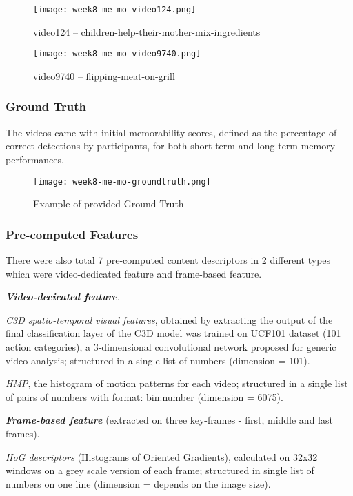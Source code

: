{\begin{figure}[!ht]
\centering
\texttt{[image: week8-me-mo-video124.png]}
\caption{video124 -- children-help-their-mother-mix-ingredients}
\end{figure}

\newpage
\begin{figure}[!ht]
\centering
\texttt{[image: week8-me-mo-video9740.png]}
\caption{video9740 -- flipping-meat-on-grill}
\end{figure}

\subsubsection{Ground Truth}
The videos came with initial memorability scores, defined as the percentage of correct detections by participants, for both short-term and long-term memory performances.

\begin{figure}[!ht]
\centering
\texttt{[image: week8-me-mo-groundtruth.png]}
\caption{Example of provided Ground Truth}
\end{figure}

\subsubsection{Pre-computed Features}
There were also total 7 pre-computed content descriptors in 2 different types which were video-dedicated feature and frame-based feature.

\textbf{\emph{Video-decicated feature}}.

\emph{C3D spatio-temporal visual features}\cite{c3d}, obtained by extracting the output of the final classification layer of the C3D model was trained on UCF101 dataset\cite{ucf101} (101 action categories), a 3-dimensional convolutional network proposed for generic video analysis; structured in a single list of numbers (dimension = 101).

\emph{HMP}\cite{hmp}, the histogram of motion patterns for each video; structured in a single list of pairs of numbers with format: bin:number (dimension = 6075).

\textbf{\emph{Frame-based feature}} (extracted on three key-frames - first, middle and last frames).

\emph{HoG descriptors} (Histograms of Oriented Gradients)\cite{hog}, calculated on 32x32 windows on a grey scale version of each frame; structured in single list of numbers on one line (dimension = depends on the image size).

}
